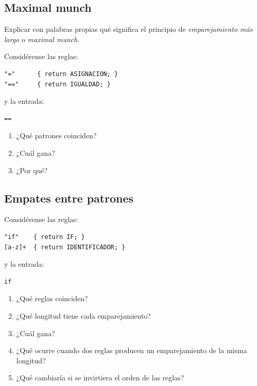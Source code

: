 \documentclass{article}
\begin{document}
\subsection{Maximal munch}

Explicar con palabras propias qué significa el principio de
\textit{emparejamiento más largo} o \textit{maximal munch}.

Considérense las reglas:

\begin{verbatim}
"="      { return ASIGNACION; }
"=="     { return IGUALDAD; }
\end{verbatim}

y la entrada:

\begin{verbatim}
==
\end{verbatim}

\begin{enumerate}
    \item ¿Qué patrones coinciden?

    \item ¿Cuál gana?

    \item ¿Por qué?
\end{enumerate}

\subsection{Empates entre patrones}

Considérense las reglas:

\begin{verbatim}
"if"    { return IF; }
[a-z]+  { return IDENTIFICADOR; }
\end{verbatim}

y la entrada:

\begin{verbatim}
if
\end{verbatim}

\begin{enumerate}
    \item ¿Qué reglas coinciden?

    \item ¿Qué longitud tiene cada emparejamiento?

    \item ¿Cuál gana?

    \item ¿Qué ocurre cuando dos reglas producen un emparejamiento de
    la misma longitud?

    \item ¿Qué cambiaría si se invirtiera el orden de las reglas?
\end{enumerate}
\end{document}
